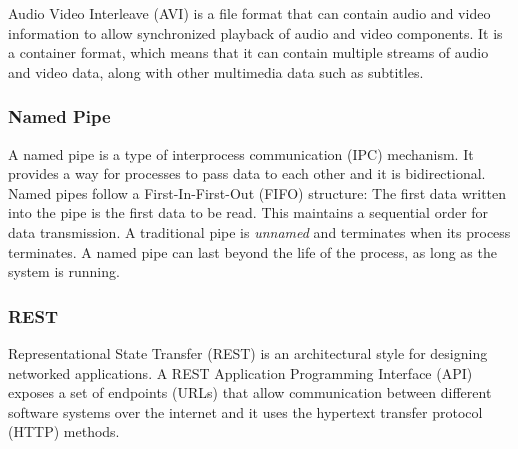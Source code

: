 \documentclass[12pt,a4paper]{article}
\begin{document}
Audio Video Interleave (AVI) is a file format that can contain audio and video information to allow synchronized playback of audio and video components. 
It is a container format, which means that it can contain multiple streams of audio and video data, along with other multimedia data such as subtitles.~\cite{avi}












\subsubsection*{Named Pipe} 

A named pipe is a type of interprocess communication (IPC) mechanism. It provides a way for processes to pass data to each other and it is bidirectional. 
Named pipes follow a First-In-First-Out (FIFO) structure: The first data written into the pipe is the first data to be read. This maintains a sequential order for data transmission.
A traditional pipe is \textit{unnamed} and terminates when its process terminates. A named pipe can last beyond the life of the process, as long as the system is running.~\cite{namedpipe}









\subsubsection*{REST} 


Representational State Transfer (REST) is an architectural style for designing networked applications. A REST Application Programming Interface (API) exposes a set of endpoints (URLs) that allow communication between different software systems over the internet and it uses the hypertext transfer protocol (HTTP) methods.~\cite{IEEE_Rest, webservice, Nodejs_Rest}











\end{document}
